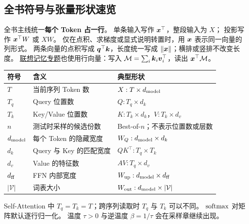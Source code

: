 \subsection{全书符号与张量形状速览}
\label{app:symbols}
全书主线统一\textbf{每个 Token 占一行}。
单条输入写作 $\boldsymbol{x}^\top$，整段输入为 $X$；
投影写作 $\boldsymbol{x}^\top W$ 或 $XW$。
仅在点积、求梯度或显式说明转置时，用 $\boldsymbol{x}$ 表示同一向量的列形式。
两条向量的点积写成 $\boldsymbol{q}^\top\boldsymbol{k}$，长度统一写成 $\|\boldsymbol{x}\|$；横排或竖排不改变长度。
\hyperref[intro:key-value-outer-product]{联想记忆专题}也使用行向量：写入 $\mathcal{M}=\sum_i \boldsymbol{k}_i\boldsymbol{v}_i^\top$，读出 $\boldsymbol{x}^\top\mathcal{M}$。

\begin{center}\small
\renewcommand{\arraystretch}{1.25}
\begin{tabularx}{\linewidth}{@{}p{27mm}p{39mm}X@{}}
\toprule
符号 & 含义 & 典型形状\\\midrule
$T$ & 当前序列 Token 数 & $X:T\times d_{\rm model}$\\
$T_q$ & Query 位置数 & $Q:T_q\times d_k$\\
$T_k$ & Key/Value 位置数 & $K:T_k\times d_k$，$V:T_k\times d_v$\\
$n$ & 测试时采样的候选份数 & Best-of-$n$；不表示位置数或层数\\
$d_{\rm model}$ & 每个 Token 的隐藏宽度 & $W_Q:d_{\rm model}\times d_k$\\
$d_k$ & Query 与 Key 的匹配宽度 & $QK^\top:T_q\times T_k$\\
$d_v$ & Value 的特征数 & $AV:T_q\times d_v$\\
$d_{\rm ff}$ & FFN 内部宽度 & $W_{\rm up}:d_{\rm model}\times d_{\rm ff}$\\
$|\mathcal V|$ & 词表大小 & $W_{\rm out}:d_{\rm model}\times|\mathcal V|$\\
\bottomrule
\end{tabularx}
\end{center}
Self-Attention 中 $T_q=T_k=T$；跨序列读取时 $T_q$ 与 $T_k$ 可以不同。
$\operatorname{softmax}$ 对矩阵默认逐行归一化。
温度 $\tau>0$ 与逆温度 $\beta=1/\tau$ 会在采样章继续出现。

